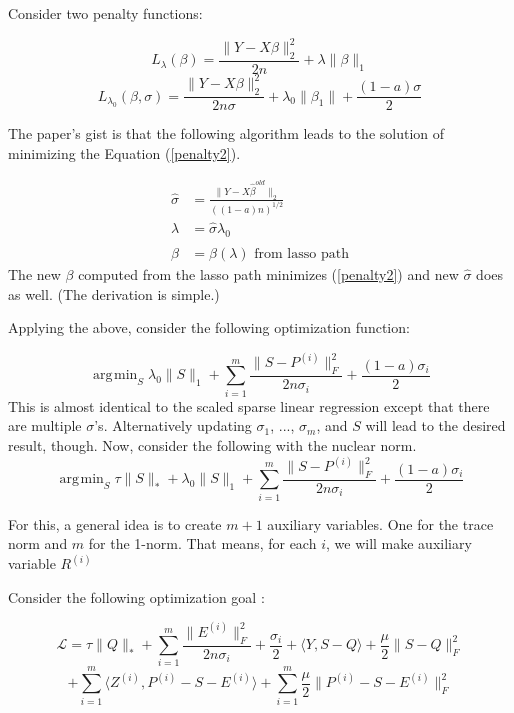 \documentclass[11pt]{article}
\DeclareMathOperator*{\argmin}{\arg\!\min}
\begin{document}
\noindent Consider two penalty functions:

\begin{equation}
L_{\lambda}(\beta) = \frac{\|Y-X\beta\|_2^2}{2n} + \lambda \|\beta\|_1
\label{penalty1}
\end{equation}
\begin{equation}
L_{\lambda_0}(\beta, \sigma) = \frac{\|Y-X\beta\|_2^2}{2n\sigma} + \lambda_0 \|\beta_1\| + \frac{(1-a)\sigma}{2}
\label{penalty2}
\end{equation}

\noindent The paper's gist is that the following algorithm leads to the solution of minimizing the Equation (\ref{penalty2}).

\begin{align}
\hat{\sigma} &= \frac{\|Y-X\hat{\beta}^{old}\|_2} {((1-a)n)^{1/2}}\\
\lambda &= \hat{\sigma} \lambda_0\\
\hat{\beta} &= \beta(\lambda) \text{  from lasso path}
\end{align}
The new $\beta$ computed from the lasso path minimizes (\ref{penalty2}) and new $\hat{\sigma}$ does as well. (The derivation is simple.)

\noindent Applying the above, consider the following optimization function:

\begin{equation}
\argmin_S \lambda_0 \|S\|_1 + \sum_{i=1}^{m} \frac{\|S-P^{(i)}\|^2_F}{2n\sigma_i} + \frac{(1-a)\sigma_i}{2}
\end{equation}
\noindent This is almost identical to the scaled sparse linear regression except that there are multiple $\sigma$'s. Alternatively updating $\sigma_1$, ..., $\sigma_m$, and $S$ will lead to the desired result, though. Now, consider the following with the nuclear norm.
\begin{equation}
\argmin_S \tau \|S\|_* + \lambda_0 \|S\|_1 + \sum_{i=1}^{m} \frac{\|S-P^{(i)}\|^2_F}{2n\sigma_i} + \frac{(1-a)\sigma_i}{2}
\end{equation}

\noindent For this, a general idea is to create $m+1$ auxiliary variables. One for the trace norm and $m$ for the 1-norm. That means, for each $i$, we will make auxiliary variable $R^{(i)}$ 	

\pagebreak

Consider the following optimization goal : 

$$\mathcal{L} = \tau\|Q\|_* + \sum_{i=1}^{m} \frac{\|E^{(i)}\|_F^2}{2n\sigma_i} + \frac{\sigma_i}{2}+ \langle Y, S-Q \rangle + \frac{\mu}{2} \|S-Q\|_F^2$$
$$+\sum_{i=1}^{m} \langle Z^{(i)}, P^{(i)} - S - E^{(i)} \rangle + \sum_{i=1}^{m} \frac{\mu}{2} \|P^{(i)}-S-E^{(i)}\|_F^2$$
\end{document}

